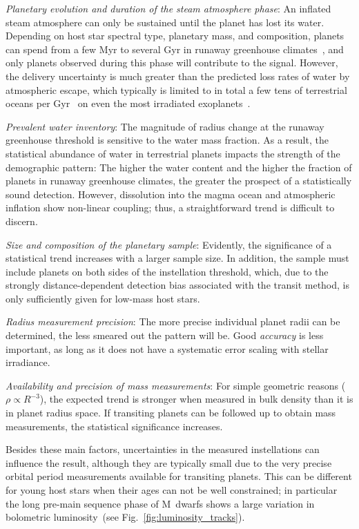 \documentclass[twocolumn,twocolappendix]{aastex631}
\begin{document}
\textit{Planetary evolution and duration of the steam atmosphere phase}: An inflated steam atmosphere can only be sustained until the planet has lost its water.
Depending on host star spectral type, planetary mass, and composition, planets can spend from a few Myr to several Gyr in runaway greenhouse climates~\citep[][]{Hamano2015,Luger2015}, and only planets observed during this phase will contribute to the signal.
However, the delivery uncertainty is much greater than the predicted loss rates of water by atmospheric escape, which typically is limited to in total a few tens of terrestrial oceans per Gyr~\citep{2018AJ....155..195W} on even the most irradiated exoplanets~\citep[see discussion in][]{2022ApJ...938L...3L}.

\textit{Prevalent water inventory}: The magnitude of radius change at the runaway greenhouse threshold is sensitive to the water mass fraction.
As a result, the statistical abundance of water in terrestrial planets impacts the strength of the demographic pattern:
The higher the water content and the higher the fraction of planets in runaway greenhouse climates, the greater the prospect of a statistically sound detection.
However, dissolution into the magma ocean and atmospheric inflation show non-linear coupling; thus, a straightforward trend is difficult to discern.

\textit{Size and composition of the planetary sample}: Evidently, the significance of a statistical trend increases with a larger sample size.
In addition, the sample must include planets on both sides of the instellation threshold, which, due to the strongly distance-dependent detection bias associated with the transit method, is only sufficiently given for low-mass host stars.

\textit{Radius measurement precision}: The more precise individual planet radii can be determined, the less smeared out the pattern will be.
Good \textit{accuracy} is less important, as long as it does not have a systematic error scaling with stellar irradiance.

\textit{Availability and precision of mass measurements}: For simple geometric reasons ($\rho \propto R^{-3}$), the expected trend is stronger when measured in bulk density than it is in planet radius space.
If transiting planets can be followed up to obtain mass measurements, the statistical significance increases.

Besides these main factors, uncertainties in the measured instellations can influence the result, although they are typically small due to the very precise orbital period measurements available for transiting planets.
This can be different for young host stars when their ages can not be well constrained; in particular the long pre-main sequence phase of M~dwarfs shows a large variation in bolometric luminosity~(see Fig.~\ref{fig:luminosity_tracks}).
\end{document}

